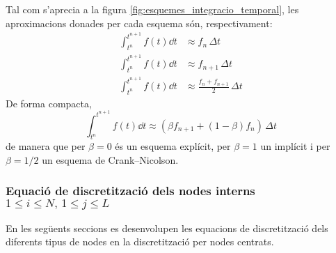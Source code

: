 Tal com s'aprecia a la figura \ref{fig:esquemes_integracio_temporal}, les aproximacions donades per cada esquema són, respectivament:
\begin{align}
	\int_{t^n}^{t^{n+1}} f(t) \dd{t} &\approx f_n \, \Delta t \\
	\int_{t^n}^{t^{n+1}} f(t) \dd{t} &\approx f_{n+1} \, \Delta t \\
	\int_{t^n}^{t^{n+1}} f(t) \dd{t} &\approx \frac{f_n + f_{n+1}}{2} \, \Delta t
\end{align}
De forma compacta,
\begin{equation}
	\int_{t^n}^{t^{n+1}} f(t) \dd{t} \approx \left( \beta f_{n+1} + (1 - \beta) f_n \right) \, \Delta t
\end{equation}
de manera que per $\beta = 0$ és un esquema explícit, per $\beta = 1$ un implícit i per $\beta = 1 / 2$ un esquema de Crank--Nicolson.

\subsubsection{Equació de discretització dels nodes interns \texorpdfstring{$1 \leq i \leq N, \, 1 \leq j \leq L$}{}}

En les següents seccions es desenvolupen les equacions de discretització dels diferents tipus de nodes en la discretització per nodes centrats. 

